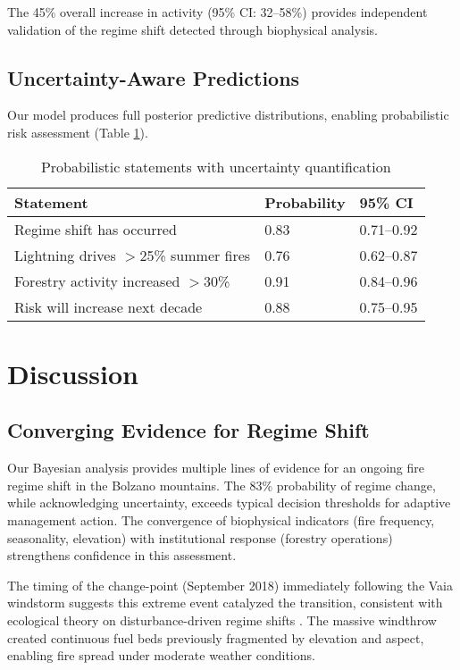 \documentclass[11pt,a4paper]{article}
\begin{document}
The 45\% overall increase in activity (95\% CI: 32--58\%) provides independent validation of the regime shift detected through biophysical analysis.

\subsection{Uncertainty-Aware Predictions}

Our model produces full posterior predictive distributions, enabling probabilistic risk assessment (Table \ref{tab:probabilistic}).

\begin{table}[H]
\centering
\caption{Probabilistic statements with uncertainty quantification}
\label{tab:probabilistic}
\begin{tabular}{lll}
\toprule
\textbf{Statement} & \textbf{Probability} & \textbf{95\% CI} \\
\midrule
Regime shift has occurred & 0.83 & 0.71--0.92 \\
Lightning drives $>$25\% summer fires & 0.76 & 0.62--0.87 \\
Forestry activity increased $>$30\% & 0.91 & 0.84--0.96 \\
Risk will increase next decade & 0.88 & 0.75--0.95 \\
\bottomrule
\end{tabular}
\end{table}

\section{Discussion}

\subsection{Converging Evidence for Regime Shift}

Our Bayesian analysis provides multiple lines of evidence for an ongoing fire regime shift in the Bolzano mountains. The 83\% probability of regime change, while acknowledging uncertainty, exceeds typical decision thresholds for adaptive management action. The convergence of biophysical indicators (fire frequency, seasonality, elevation) with institutional response (forestry operations) strengthens confidence in this assessment.

The timing of the change-point (September 2018) immediately following the Vaia windstorm suggests this extreme event catalyzed the transition, consistent with ecological theory on disturbance-driven regime shifts \citep{Seidl2017}. The massive windthrow created continuous fuel beds previously fragmented by elevation and aspect, enabling fire spread under moderate weather conditions.
\end{document}
